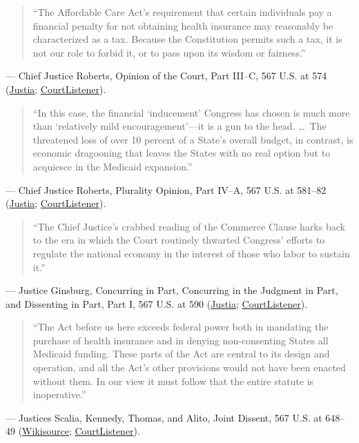 \documentclass[12pt]{article}
\begin{document}
\begin{quote}
``The Affordable Care Act's requirement that certain individuals pay a financial penalty for not obtaining health insurance may reasonably be characterized as a tax. Because the Constitution permits such a tax, it is not our role to forbid it, or to pass upon its wisdom or fairness.''
\end{quote}
\noindent --- Chief Justice Roberts, Opinion of the Court, Part III--C, 567 U.S. at 574 (\href{https://supreme.justia.com/cases/federal/us/567/519/}{Justia}; \href{https://www.courtlistener.com/opinion/809122/national-federation-of-independent-business-v-sebelius/}{CourtListener}).

\begin{quote}
``In this case, the financial `inducement' Congress has chosen is much more than `relatively mild encouragement'---it is a gun to the head. \ldots\ The threatened loss of over 10 percent of a State's overall budget, in contrast, is economic dragooning that leaves the States with no real option but to acquiesce in the Medicaid expansion.''
\end{quote}
\noindent --- Chief Justice Roberts, Plurality Opinion, Part IV--A, 567 U.S. at 581--82 (\href{https://supreme.justia.com/cases/federal/us/567/519/}{Justia}; \href{https://www.courtlistener.com/opinion/809122/national-federation-of-independent-business-v-sebelius/}{CourtListener}).

\begin{quote}
``The Chief Justice's crabbed reading of the Commerce Clause harks back to the era in which the Court routinely thwarted Congress' efforts to regulate the national economy in the interest of those who labor to sustain it.''
\end{quote}
\noindent --- Justice Ginsburg, Concurring in Part, Concurring in the Judgment in Part, and Dissenting in Part, Part I, 567 U.S. at 590 (\href{https://supreme.justia.com/cases/federal/us/567/519/}{Justia}; \href{https://www.courtlistener.com/opinion/809122/national-federation-of-independent-business-v-sebelius/}{CourtListener}).

\begin{quote}
``The Act before us here exceeds federal power both in mandating the purchase of health insurance and in denying non-consenting States all Medicaid funding. These parts of the Act are central to its design and operation, and all the Act's other provisions would not have been enacted without them. In our view it must follow that the entire statute is inoperative.''
\end{quote}
\noindent --- Justices Scalia, Kennedy, Thomas, and Alito, Joint Dissent, 567 U.S. at 648--49 (\href{https://en.wikisource.org/wiki/National_Federation_of_Independent_Business_v._Sebelius/Dissent_Scalia,_Kennedy,_Thomas,_and_Alito}{Wikisource}; \href{https://www.courtlistener.com/opinion/809122/national-federation-of-independent-business-v-sebelius/}{CourtListener}).
\end{document}
